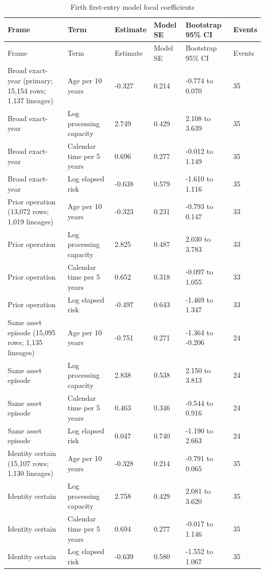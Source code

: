 \documentclass[12pt,a4paper]{article}
\begin{document}
\clearpage
\begingroup
\scriptsize
\setlength{\tabcolsep}{2.4pt}
\renewcommand{\arraystretch}{1.10}
\setlength{\LTleft}{\fill}
\setlength{\LTright}{\fill}
\begin{longtable}{L{2.95cm}L{2.75cm}R{1.25cm}R{1.35cm}L{2.35cm}R{0.9cm}}
\caption{Firth first-entry model focal coefficients}
\label{tab:appendix-entry}\\
\toprule
Frame & Term & Estimate & Model SE & Bootstrap 95\% CI & Events \\
\midrule
\endfirsthead
\toprule
Frame & Term & Estimate & Model SE & Bootstrap 95\% CI & Events \\
\midrule
\endhead
Broad exact-year (primary; 15,154 rows; 1,137 lineages) & Age per 10 years & -0.327 & 0.214 & -0.774 to 0.070 & 35 \\
Broad exact-year & Log processing capacity & 2.749 & 0.429 & 2.108 to 3.639 & 35 \\
Broad exact-year & Calendar time per 5 years & 0.696 & 0.277 & -0.012 to 1.149 & 35 \\
Broad exact-year & Log elapsed risk & -0.638 & 0.579 & -1.610 to 1.116 & 35 \\
Prior operation (13,072 rows; 1,019 lineages) & Age per 10 years & -0.323 & 0.231 & -0.793 to 0.147 & 33 \\
Prior operation & Log processing capacity & 2.825 & 0.487 & 2.030 to 3.783 & 33 \\
Prior operation & Calendar time per 5 years & 0.652 & 0.318 & -0.097 to 1.055 & 33 \\
Prior operation & Log elapsed risk & -0.497 & 0.643 & -1.469 to 1.347 & 33 \\
Same asset episode (15,095 rows; 1,135 lineages) & Age per 10 years & -0.751 & 0.271 & -1.364 to -0.206 & 24 \\
Same asset episode & Log processing capacity & 2.838 & 0.538 & 2.150 to 3.813 & 24 \\
Same asset episode & Calendar time per 5 years & 0.463 & 0.346 & -0.544 to 0.916 & 24 \\
Same asset episode & Log elapsed risk & 0.047 & 0.740 & -1.190 to 2.663 & 24 \\
Identity certain (15,107 rows; 1,130 lineages) & Age per 10 years & -0.328 & 0.214 & -0.791 to 0.065 & 35 \\
Identity certain & Log processing capacity & 2.758 & 0.429 & 2.081 to 3.620 & 35 \\
Identity certain & Calendar time per 5 years & 0.694 & 0.277 & -0.017 to 1.146 & 35 \\
Identity certain & Log elapsed risk & -0.639 & 0.580 & -1.552 to 1.067 & 35 \\
\bottomrule
\end{longtable}
\endgroup
\end{document}
